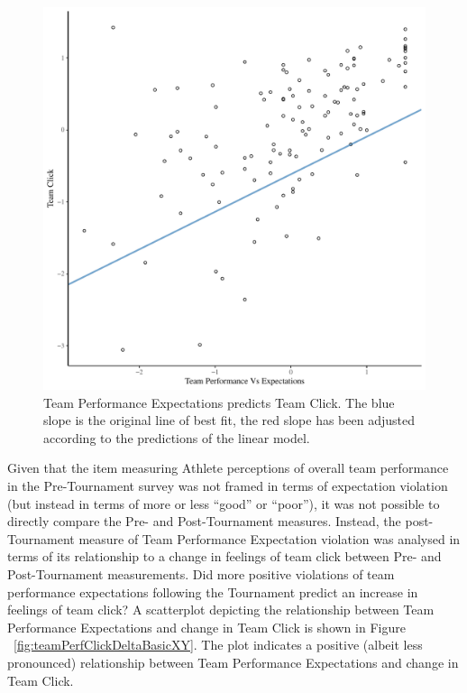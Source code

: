\begin{CJK}{UTF8}{gbsn}
  \begin{figure}[htbp]
    \centering
  \includegraphics[scale=.5]{images/teamPerfClickModelSlope.pdf}
    \caption{Team Performance Expectations predicts Team Click. The blue slope is the original line of best fit, the red slope has been adjusted according to the predictions of the linear model.}
    \label{fig:teamPerfClickModelSlope}
  \end{figure}



Given that the item measuring Athlete perceptions of overall team performance in the Pre-Tournament survey was not framed in terms of expectation violation (but instead in terms of more or less ``good'' or ``poor''), it was not possible to directly compare the Pre- and Post-Tournament measures.  Instead, the post-Tournament measure of Team Performance Expectation violation was analysed in terms of its relationship to a change in feelings of team click between Pre- and Post-Tournament measurements. Did more positive violations of team performance expectations following the Tournament predict an increase in feelings of team click? A scatterplot depicting the relationship between Team Performance Expectations and change in Team Click is shown in Figure ~\ref{fig:teamPerfClickDeltaBasicXY}. The plot indicates a positive (albeit less pronounced) relationship between Team Performance Expectations and change in Team Click.


\end{CJK}
